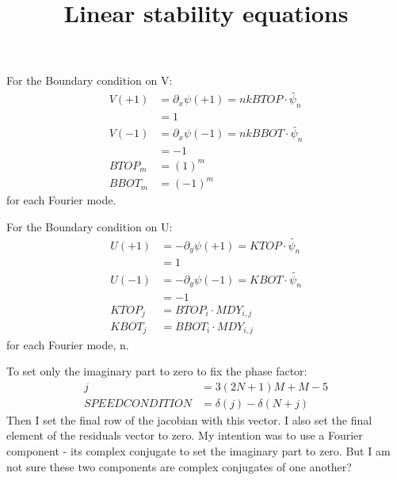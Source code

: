 \documentclass[12,a4paper]{article}
\newcommand{\dd}[1]{\partial_{#1}}
\begin{document}
\title{Linear stability equations}
\maketitle

\noindent For the Boundary condition on V:
\begin {align}
    V(+1) &= \dd{x} \psi(+1) = nkBTOP \cdot \widetilde{\psi_{n}} \\
	  &= 1 \\
    V(-1) &= \dd{x} \psi(-1) = nkBBOT \cdot \widetilde{\psi_{n}} \\
	  &= -1 \\
    BTOP_{m}  &= (1)^m \\
    BBOT_{m}  &= (-1)^m
\end {align}
for each Fourier mode.

For the Boundary condition on U:
\begin{align}
    U(+1) &= -\dd{y} \psi(+1) = KTOP \cdot \widetilde{\psi_{n}} \\
          &= 1\\
    U(-1) &= -\dd{y} \psi(-1) = KBOT \cdot \widetilde{\psi_{n}} \\
          &= -1 \\
    KTOP_{j}  &= BTOP_{i} \cdot MDY_{i,j} \\
    KBOT_{j}  &= BBOT_{i} \cdot MDY_{i,j}
\end{align}
for each Fourier mode, n.

To set only the imaginary part to zero to fix the phase factor:
\begin{align}
    j &= 3(2N+1)M + M-5 \\
    SPEEDCONDITION &= \delta(j) - \delta(N+j) 
\end{align}
Then I set the final row of the jacobian with this vector. I also set the final element of the residuals vector to zero. My intention was to use a Fourier component - its complex conjugate to set the imaginary part to zero. But I am not sure these two components are complex conjugates of one another?
\end{document}

